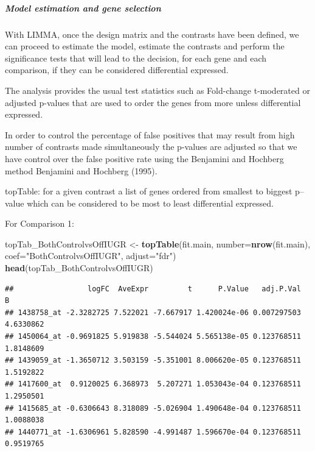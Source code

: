 \documentclass[]{article}
\newenvironment{Shaded}{\begin{snugshade}}{\end{snugshade}}
\newcommand{\KeywordTok}[1]{\textcolor[rgb]{0.13,0.29,0.53}{\textbf{#1}}}
\newcommand{\DataTypeTok}[1]{\textcolor[rgb]{0.13,0.29,0.53}{#1}}
\newcommand{\StringTok}[1]{\textcolor[rgb]{0.31,0.60,0.02}{#1}}
\newcommand{\NormalTok}[1]{#1}
\let\oldsubparagraph\subparagraph
\renewcommand{\subparagraph}[1]{\oldsubparagraph{#1}\mbox{}}
\begin{document}
\subparagraph{Model estimation and gene
selection}\label{model-estimation-and-gene-selection}

With LIMMA, once the design matrix and the contrasts have been defined,
we can proceed to estimate the model, estimate the contrasts and perform
the significance tests that will lead to the decision, for each gene and
each comparison, if they can be considered differential expressed.

The analysis provides the usual test statistics such as Fold-change
t-moderated or adjusted p-values that are used to order the genes from
more unless differential expressed.

In order to control the percentage of false positives that may result
from high number of contrasts made simultaneously the p-values are
adjusted so that we have control over the false positive rate using the
Benjamini and Hochberg method Benjamini and Hochberg (1995).

topTable: for a given contrast a list of genes ordered from smallest to
biggest p--value which can be considered to be most to least
differential expressed.

For Comparison 1:

\begin{Shaded}
\begin{Highlighting}[]
\NormalTok{topTab_BothControlvsOffIUGR <-}\StringTok{ }
\StringTok{  }\KeywordTok{topTable}\NormalTok{(fit.main, }
           \DataTypeTok{number=}\KeywordTok{nrow}\NormalTok{(fit.main),}
           \DataTypeTok{coef=}\StringTok{"BothControlvsOffIUGR"}\NormalTok{,}
           \DataTypeTok{adjust=}\StringTok{"fdr"}\NormalTok{) }
\KeywordTok{head}\NormalTok{(topTab_BothControlvsOffIUGR)}
\end{Highlighting}
\end{Shaded}

\begin{verbatim}
##                 logFC  AveExpr         t      P.Value   adj.P.Val         B
## 1438758_at -2.3282725 7.522021 -7.667917 1.420024e-06 0.007297503 4.6330862
## 1450064_at -0.9691825 5.919838 -5.544024 5.565138e-05 0.123768511 1.8148609
## 1439059_at -1.3650712 3.503159 -5.351001 8.006620e-05 0.123768511 1.5192822
## 1417600_at  0.9120025 6.368973  5.207271 1.053043e-04 0.123768511 1.2950501
## 1415685_at -0.6306643 8.318089 -5.026904 1.490648e-04 0.123768511 1.0088038
## 1440771_at -1.6306961 5.828590 -4.991487 1.596670e-04 0.123768511 0.9519765
\end{verbatim}
\end{document}
